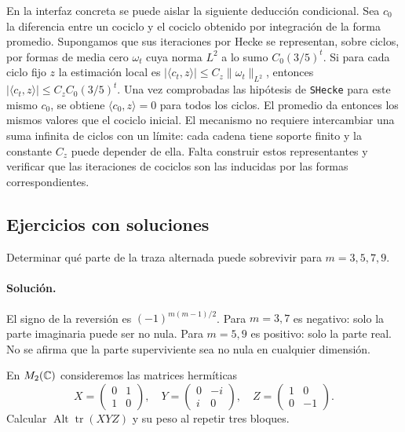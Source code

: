 En la interfaz concreta se puede aislar la siguiente deducción condicional. Sea $c_0$ la diferencia entre un cociclo y el cociclo obtenido por integración de la forma promedio. Supongamos que sus iteraciones por Hecke se representan, sobre ciclos, por formas de media cero $\omega_t$ cuya norma $L^2$ a lo sumo $C_0(3/5)^t$. Si para cada ciclo fijo $z$ la estimación local es $|\langle c_t,z\rangle|\le C_z\|\omega_t\|_{L^2}$, entonces $|\langle c_t,z\rangle|\le C_zC_0(3/5)^t$. Una vez comprobadas las hipótesis de \texttt{SHecke} para este mismo $c_0$, se obtiene $\langle c_0,z\rangle=0$ para todos los ciclos. El promedio da entonces los mismos valores que el cociclo inicial. El mecanismo no requiere intercambiar una suma infinita de ciclos con un límite: cada cadena tiene soporte finito y la constante $C_z$ puede depender de ella. Falta construir estos representantes y verificar que las iteraciones de cociclos son las inducidas por las formas correspondientes.

\subsection{Ejercicios con soluciones}

\begin{ejercicio}
Determinar qué parte de la traza alternada puede sobrevivir para $m=3,5,7,9$.
\end{ejercicio}
\paragraph{Solución.} El signo de la reversión es $(-1)^{m(m-1)/2}$. Para $m=3,7$ es negativo: solo la parte imaginaria puede ser no nula. Para $m=5,9$ es positivo: solo la parte real. No se afirma que la parte superviviente sea no nula en cualquier dimensión.

\clearpage
\begin{ejercicio}
En $M_2(\mathbb{C})$ consideremos las matrices hermíticas
\[
 X=\begin{pmatrix}0&1\\1&0\end{pmatrix},\quad Y=\begin{pmatrix}0&-i\\i&0\end{pmatrix},\quad Z=\begin{pmatrix}1&0\\0&-1\end{pmatrix}.
\]
Calcular $\operatorname{Alt}\operatorname{tr}(XYZ)$ y su peso al repetir tres bloques.
\end{ejercicio}
